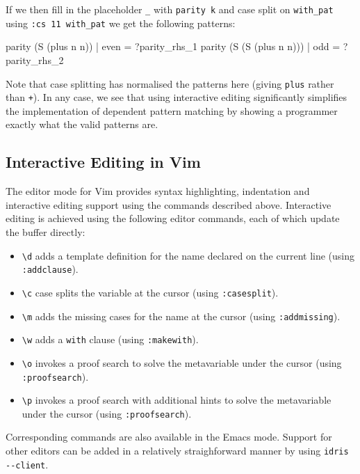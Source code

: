 \noindent
If we then fill in the placeholder \verb!_! with \verb!parity k! and case split on \verb!with_pat! using \verb!:cs 11 with_pat! we get the following patterns:

\begin{code}
  parity (S (plus n n)) | even = ?parity_rhs_1
  parity (S (S (plus n n))) | odd = ?parity_rhs_2
\end{code}

\noindent
Note that case splitting has normalised the patterns here (giving \texttt{plus} rather than \texttt{+}).
In any case, we see that using interactive editing significantly simplifies the implementation of dependent pattern matching by showing a programmer exactly what the valid patterns are.

\subsection{Interactive Editing in Vim}

The editor mode for Vim provides syntax highlighting, indentation and interactive editing support using the commands described above.
Interactive editing is achieved using the following editor commands, each of which update the buffer directly:

\begin{itemize}
\item \verb!\d! adds a template definition for the name declared on the current line (using \texttt{:addclause}).
\item \verb!\c! case splits the variable at the cursor (using \texttt{:casesplit}).
\item \verb!\m! adds the missing cases for the name at the cursor (using \texttt{:addmissing}).
\item \verb!\w! adds a \texttt{with} clause (using \texttt{:makewith}). 
\item \verb!\o! invokes a proof search to solve the metavariable under the cursor (using \texttt{:proofsearch}).
\item \verb!\p! invokes a proof search with additional hints to solve the metavariable under the cursor (using \texttt{:proofsearch}).
\end{itemize}

\noindent
Corresponding commands are also available in the Emacs mode.
Support for other editors can be added in a relatively straighforward manner by using \verb!idris --client!.


